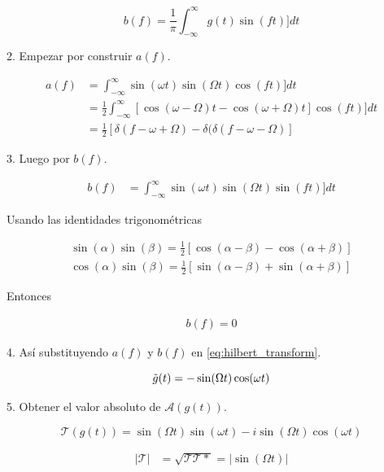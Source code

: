 \begin{equation}
    b(f)=\frac{1}{\pi}\int_{-\infty}^{\infty} g(t)\sin(ft)]dt
\end{equation}

    2. Empezar por construir $a(f)$.

\begin{align*}
    a(f) &= \int_{-\infty}^{\infty} \sin(\omega t)\sin(\Omega t)\cos(ft)]dt \\
        \quad &= \frac{1}{2}\int_{-\infty}^{\infty} [\cos(\omega-\Omega)t - \cos(\omega+\Omega)t]\cos(ft)]dt \\
        \quad &= \frac{1}{2}[\delta(f-\omega+\Omega)-\delta(\delta(f-\omega-\Omega)]
\end{align*}

    3. Luego por $b(f)$.
    
\begin{align*}
    b(f) &= \int_{-\infty}^{\infty} \sin(\omega t)\sin(\Omega t)\sin(ft)]dt
\end{align*} 

    Usando las identidades trigonométricas
    
\begin{align*}
    \sin(\alpha)\sin(\beta)=\frac{1}{2}[\cos(\alpha-\beta)-\cos(\alpha+\beta)] \\
    \cos(\alpha)\sin(\beta)=\frac{1}{2}[\sin(\alpha-\beta)+\sin(\alpha+\beta)]
\end{align*}
    
    Entonces
    
\begin{align*}
    b(f) = 0
\end{align*}

    4. Así substituyendo $a(f)$ y $b(f)$ en \ref{eq:hilbert_transform}.

\begin{equation}
    \Tilde{g}(t)=-\sin(\Omega t)\cos(\omega t)
\end{equation}

    5. Obtener el valor absoluto de $\mathscr{A}(g(t))$.
    
\begin{equation}
    \mathcal{T}(g(t))=\sin(\Omega t)\sin(\omega t)-i\sin(\Omega t)\cos(\omega t)
\end{equation}

\begin{align*}
    |\mathcal{T}| &= \sqrt{\mathcal{T}\mathcal{T}*} = |\sin(\Omega t)|
\end{align*}

